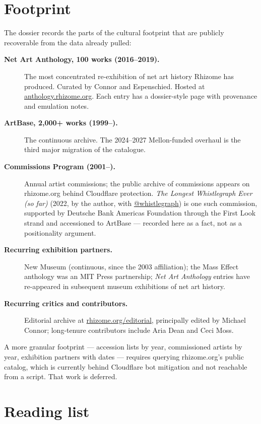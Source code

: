 \documentclass[10pt,letterpaper,twocolumn]{article}
\begin{document}
\section{Footprint}

The dossier records the parts of the cultural footprint that are publicly recoverable from the data already pulled:

\begin{description}
\item[\textbf{Net Art Anthology, 100 works (2016--2019).}] The most concentrated re-exhibition of net art history Rhizome has produced. Curated by Connor and Espenschied. Hosted at \href{https://anthology.rhizome.org}{anthology.rhizome.org}. Each entry has a dossier-style page with provenance and emulation notes.
\item[\textbf{ArtBase, 2{,}000+ works (1999--).}] The continuous archive. The 2024--2027 Mellon-funded overhaul is the third major migration of the catalogue.
\item[\textbf{Commissions Program (2001--).}] Annual artist commissions; the public archive of commissions appears on rhizome.org behind Cloudflare protection. \emph{The Longest Whistlegraph Ever (so far)} (2022, by the author, with \href{https://prompt.ac/@whistlegraph}{@whistlegraph}) is one such commission, supported by Deutsche Bank Americas Foundation through the First Look strand and accessioned to ArtBase --- recorded here as a fact, not as a positionality argument.
\item[\textbf{Recurring exhibition partners.}] New Museum (continuous, since the 2003 affiliation); the Mass Effect anthology was an MIT Press partnership; \emph{Net Art Anthology} entries have re-appeared in subsequent museum exhibitions of net art history.
\item[\textbf{Recurring critics and contributors.}] Editorial archive at \href{https://rhizome.org/editorial/}{rhizome.org/editorial}, principally edited by Michael Connor; long-tenure contributors include Aria Dean and Ceci Moss.
\end{description}

A more granular footprint --- accession lists by year, commissioned artists by year, exhibition partners with dates --- requires querying rhizome.org's public catalog, which is currently behind Cloudflare bot mitigation and not reachable from a script. That work is deferred.

\section{Reading list}
\end{document}
